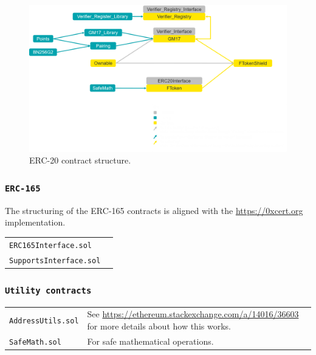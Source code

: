 \begin{figure}[H]
	\begin{center}
		\begin{mdframed}[backgroundcolor=black,userdefinedwidth=\textwidth,align=center]
		\includegraphics[width=\textwidth]{images/ft-contracts.png}
		\end{mdframed}
	\end{center}
	\caption{ERC-20 contract structure.}
	\label{pic:ftSmartContract}
\end{figure}

\subsubsection{\texttt{ERC-165}}
The structuring of the ERC-165 contracts is aligned with the \url{https://0xcert.org} implementation.
\begin{center}
	\begin{tabular}{ll}
		\texttt{ERC165Interface.sol} & \\
		\texttt{SupportsInterface.sol} &  \\
	\end{tabular}
\end{center}

\subsubsection{\texttt{Utility contracts}}
\begin{center}
	\begin{tabular}{ll}
		\texttt{AddressUtils.sol} & See \url{https://ethereum.stackexchange.com/a/14016/36603} for more details about how this works. \\
		\texttt{SafeMath.sol} & For safe mathematical operations.  \\
	\end{tabular}
\end{center}

